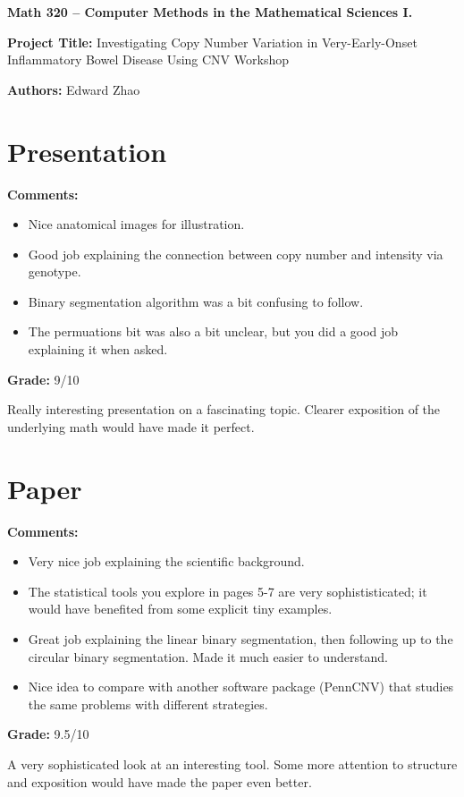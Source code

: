 \documentclass[12pt]{article}
\begin{document}
{\bf \large Math 320 -- Computer Methods in the Mathematical Sciences I.}\\

\vspace{3mm}

{\bf \large Project Title:} Investigating Copy Number Variation in Very-Early-Onset Inflammatory Bowel Disease Using CNV Workshop\\
\vspace{2mm}

{\bf \large Authors:} Edward Zhao\\

\vspace{3mm}

\section{Presentation}
{\bf \large Comments:}
\begin{itemize}
\item Nice anatomical images for illustration.
\item Good job explaining the connection between copy number
and intensity via genotype.
\item Binary segmentation algorithm was a bit confusing to follow.
\item The permuations bit was also a bit unclear, but you did a 
good job explaining it when asked.
\end{itemize}

{\bf \large Grade:} 9/10

Really interesting presentation on a fascinating topic. Clearer
exposition of the underlying math would have made it perfect.
\section{Paper}

{\bf \large Comments:}
\begin{itemize}
\item Very nice job explaining the scientific background.
\item The statistical tools you explore in pages 5-7
are very sophististicated; it would have benefited from some explicit
tiny examples.
\item Great job explaining the linear binary segmentation, then
following up to the circular binary segmentation. Made it much easier
to understand.
\item Nice idea to compare with another software package (PennCNV) that
studies the same problems with different strategies.
\end{itemize}

{\bf \large Grade:} 9.5/10

A very sophisticated look at an interesting tool. Some
more attention to structure and exposition would have made the
paper even better.
\end{document}
